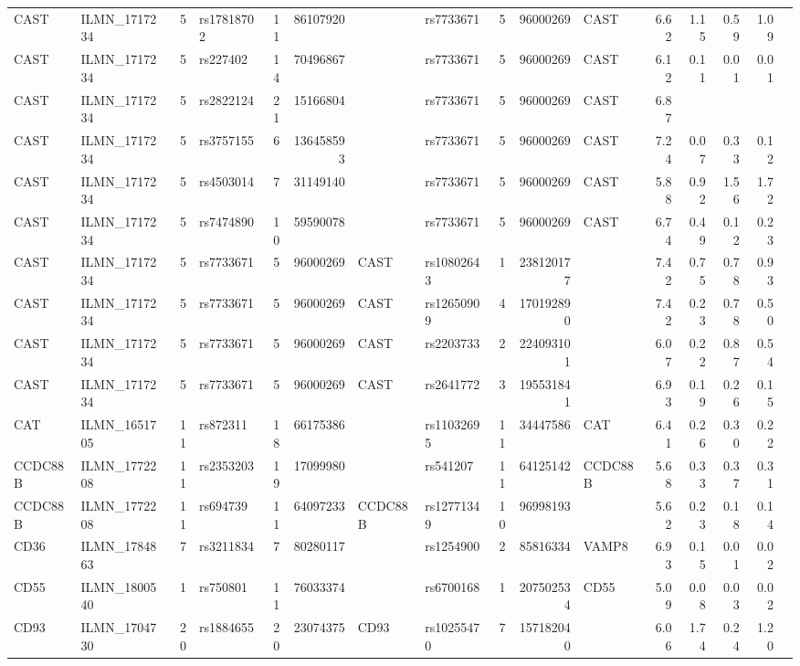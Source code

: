\documentclass{article}
\begin{document}
\begin{landscape}
{\begin{ThreePartTable}
\begin{longtable}{|llr|lrrl|lrrl|rrrr|r|}
  CAST & ILMN\_1717234 & 5 & rs17818702 & 11 & 86107920 &  & rs7733671 & 5 & 96000269 & CAST & 6.62 & 1.15 & 0.59 & 1.09 &  \\
  CAST & ILMN\_1717234 & 5 & rs227402 & 14 & 70496867 &  & rs7733671 & 5 & 96000269 & CAST & 6.12 & 0.11 & 0.01 & 0.01 &  \\
  CAST & ILMN\_1717234 & 5 & rs2822124 & 21 & 15166804 &  & rs7733671 & 5 & 96000269 & CAST & 6.87 &  &  &  &  \\
  CAST & ILMN\_1717234 & 5 & rs3757155 & 6 & 136458593 &  & rs7733671 & 5 & 96000269 & CAST & 7.24 & 0.07 & 0.33 & 0.12 &  \\
  CAST & ILMN\_1717234 & 5 & rs4503014 & 7 & 31149140 &  & rs7733671 & 5 & 96000269 & CAST & 5.88 & 0.92 & 1.56 & 1.72 &  \\
  CAST & ILMN\_1717234 & 5 & rs7474890 & 10 & 59590078 &  & rs7733671 & 5 & 96000269 & CAST & 6.74 & 0.49 & 0.12 & 0.23 &  \\
  CAST & ILMN\_1717234 & 5 & rs7733671 & 5 & 96000269 & CAST & rs10802643 & 1 & 238120177 &  & 7.42 & 0.75 & 0.78 & 0.93 &  \\
  CAST & ILMN\_1717234 & 5 & rs7733671 & 5 & 96000269 & CAST & rs12650909 & 4 & 170192890 &  & 7.42 & 0.23 & 0.78 & 0.50 &  \\
  CAST & ILMN\_1717234 & 5 & rs7733671 & 5 & 96000269 & CAST & rs2203733 & 2 & 224093101 &  & 6.07 & 0.22 & 0.87 & 0.54 &  \\
  CAST & ILMN\_1717234 & 5 & rs7733671 & 5 & 96000269 & CAST & rs2641772 & 3 & 195531841 &  & 6.93 & 0.19 & 0.26 & 0.15 &  \\
  CAT & ILMN\_1651705 & 11 & rs872311 & 18 & 66175386 &  & rs11032695 & 11 & 34447586 & CAT & 6.41 & 0.26 & 0.30 & 0.22 &  \\
  CCDC88B & ILMN\_1772208 & 11 & rs2353203 & 19 & 17099980 &  & rs541207 & 11 & 64125142 & CCDC88B & 5.68 & 0.33 & 0.37 & 0.31 &  \\
  CCDC88B & ILMN\_1772208 & 11 & rs694739 & 11 & 64097233 & CCDC88B & rs12771349 & 10 & 96998193 &  & 5.62 & 0.23 & 0.18 & 0.14 &  \\
  CD36 & ILMN\_1784863 & 7 & rs3211834 & 7 & 80280117 &  & rs1254900 & 2 & 85816334 & VAMP8 & 6.93 & 0.15 & 0.01 & 0.02 &  \\
  CD55 & ILMN\_1800540 & 1 & rs750801 & 11 & 76033374 &  & rs6700168 & 1 & 207502534 & CD55 & 5.09 & 0.08 & 0.03 & 0.02 &  \\
  CD93 & ILMN\_1704730 & 20 & rs1884655 & 20 & 23074375 & CD93 & rs10255470 & 7 & 157182040 &  & 6.06 & 1.74 & 0.24 & 1.20 &  \\

\end{longtable}
\end{ThreePartTable}}
\end{landscape}
\end{document}
